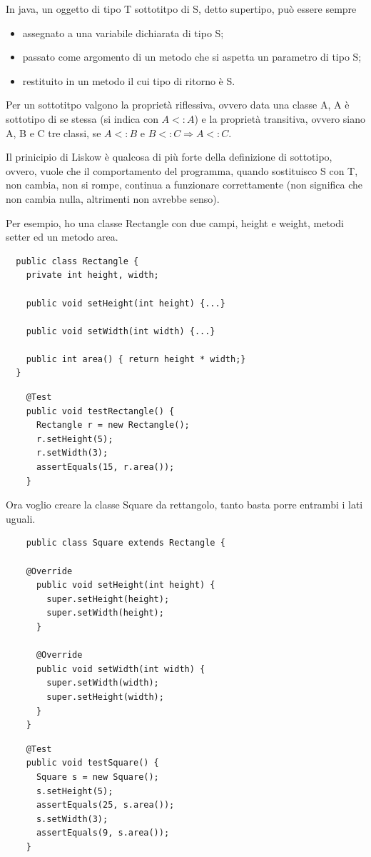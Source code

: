 In java, un oggetto di tipo T sottotitpo di S, detto supertipo, può essere sempre
\begin{itemize}
  \item assegnato a una variabile dichiarata di tipo S;
  \item passato come argomento di un metodo che si aspetta un parametro di tipo S;
  \item restituito in un metodo il cui tipo di ritorno è S.
\end{itemize}

Per un sottotitpo valgono la proprietà riflessiva, ovvero data una classe A, A è sottotipo di se stessa (si indica con $A<:A$) e la proprietà transitiva, ovvero siano 
A, B e C tre classi, se $A<:B$ e $B<:C\Rightarrow A<:C$.

Il prinicipio di Liskow è qualcosa di più forte della definizione di sottotipo, ovvero, vuole che il comportamento del programma, quando sostituisco S con T, non 
cambia, non si rompe, continua a funzionare correttamente (non significa che non cambia nulla, altrimenti non avrebbe senso).

Per esempio, ho una classe Rectangle con due campi, height e weight, metodi setter ed un metodo area.
\begin{multicols}{2}
  \begin{lstlisting}
  public class Rectangle {
    private int height, width;
    
    public void setHeight(int height) {...}

    public void setWidth(int width) {...}

    public int area() { return height * width;}
  }
  \end{lstlisting}
  \columnbreak
  \begin{lstlisting}
    @Test
    public void testRectangle() {
      Rectangle r = new Rectangle();
      r.setHeight(5);
      r.setWidth(3);
      assertEquals(15, r.area());
    }
  \end{lstlisting}
\end{multicols}

Ora voglio creare la classe Square da rettangolo, tanto basta porre entrambi i lati uguali.\\
\begin{multicols}{2}
  \begin{lstlisting}
    public class Square extends Rectangle {
      
    @Override
      public void setHeight(int height) {
        super.setHeight(height);
        super.setWidth(height);
      }

      @Override
      public void setWidth(int width) {
        super.setWidth(width);
        super.setHeight(width);
      }
    }
  \end{lstlisting}
  \columnbreak
  \begin{lstlisting}
    @Test
    public void testSquare() {
      Square s = new Square();
      s.setHeight(5);
      assertEquals(25, s.area());
      s.setWidth(3);
      assertEquals(9, s.area());
    }
  \end{lstlisting}
\end{multicols}  

